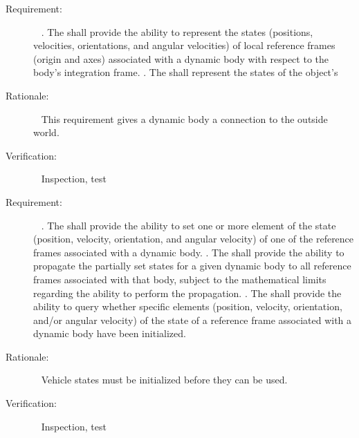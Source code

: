 \label{reqt:state_representation}
\begin{description}
\item[Requirement:]\ \newline
  \label{reqt:state_rep_sub}.
    The \ModelDesc shall provide the ability to represent the states
    (positions, velocities, orientations, and angular velocities)
    of local reference frames (origin and axes) associated with a dynamic body
    with respect to the body's integration frame.
  \label{reqt:state_rep_details}.
    The \ModelDesc shall represent the states of the object's

\item[Rationale:]\ \newline
  This requirement gives a dynamic body a connection to the outside world.

\item[Verification:]\ \newline
  Inspection, test
\end{description}


\label{reqt:staged_initialization}
\begin{description}
\item[Requirement:]\ \newline
  \label{reqt:partial_init}.
    The \ModelDesc shall provide the ability to set one or more element of the
    state (position, velocity, orientation, and angular velocity) of one of the
    reference frames associated with a dynamic body.
  \label{reqt:partial_prop}.
    The \ModelDesc shall provide the ability to propagate the partially set
    states for a given dynamic body to all reference frames associated with
    that body, subject to the mathematical limits regarding the ability to
    perform the propagation.
  \label{reqt:init_query}.
    The \ModelDesc shall provide the ability to query whether
    specific elements (position, velocity, orientation, and/or angular velocity)
    of the state of a reference frame associated with a dynamic body
    have been initialized.

\item[Rationale:]\ \newline
  Vehicle states must be initialized before they can be used.

\item[Verification:]\ \newline
  Inspection, test
\end{description}


